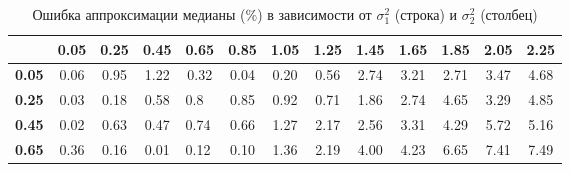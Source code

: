 \documentclass[12pt]{article}
\begin{document}
	\begin{table}[!hhh]
		\caption{Ошибка аппроксимации медианы ($\%$) в зависимости от $\sigma_{1}^{2}$ (строка) и $\sigma_{2}^{2}$ (столбец)}
		\label{tab1}
		
		\begin{tabular}{|c|ccclcccccccc}
			\hline
			\textbf{}                         & \multicolumn{1}{c|}{\textbf{0.05}} & \multicolumn{1}{c|}{\textbf{0.25}} & \multicolumn{1}{c|}{\textbf{0.45}} & \multicolumn{1}{l|}{\textbf{0.65}} & \multicolumn{1}{c|}{\textbf{0.85}} & \multicolumn{1}{c|}{\textbf{1.05}} & \multicolumn{1}{c|}{\textbf{1.25}} & \multicolumn{1}{c|}{\textbf{1.45}} & \multicolumn{1}{c|}{\textbf{1.65}} & \multicolumn{1}{c|}{\textbf{1.85}} & \multicolumn{1}{c|}{\textbf{2.05}} & \multicolumn{1}{c|}{\textbf{2.25}} \\ \hline
			\textbf{0.05}                       & 0.06                               & 0.95                               & 1.22                               & \multicolumn{1}{c}{0.32}           & 0.04                               & 0.20                               & 0.56                               & 2.74                               & 3.21                               & 2.71                               & 3.47                               & 4.68                               \\ \cline{1-1}
			\textbf{0.25}                       & 0.03                               & 0.18                               & 0.58                               & 0.8                                & 0.85                               & 0.92                               & 0.71                               & 1.86                               & 2.74                               & 4.65                               & 3.29                               & 4.85                               \\ \cline{1-1}
			\textbf{0.45}                       & 0.02                               & 0.63                               & 0.47                               & 0.74                               & 0.66                               & 1.27                               & 2.17                               & 2.56                               & 3.31                               & 4.29                               & 5.72                               & 5.16                               \\ \cline{1-1}
			\textbf{0.65}                       & 0.36                               & 0.16                               & 0.01                               & 0.12                               & 0.10                               & 1.36                               & 2.19                               & 4.00                               & 4.23                               & 6.65                               & 7.41                               & 7.49                               \\ \cline{1-1}

\end{tabular}
\end{table}
\end{document}
